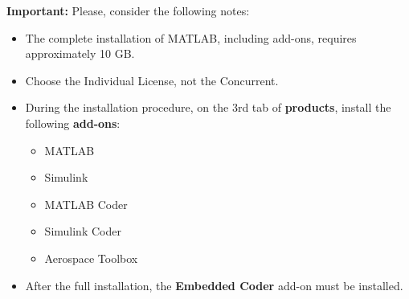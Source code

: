 \textbf{\textcolor{mRedBrown}{Important:}} Please, consider the following notes:
\begin{itemize}
	\item The complete installation of MATLAB, including add-ons, requires approximately 10 GB.
	
	\item Choose the Individual License, not the Concurrent.
	
	\item During the installation procedure, on the 3rd tab of \textbf{products}, install the following \textbf{add-ons}:
	\begin{itemize}
		\item MATLAB
		\item Simulink
		\item MATLAB Coder
		\item Simulink Coder
		\item Aerospace Toolbox
	\end{itemize}
	
	\item After the full installation, the \textbf{Embedded Coder} add-on must be installed.
\end{itemize}
